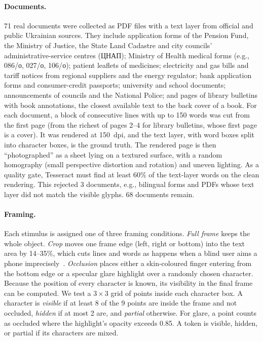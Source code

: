 \documentclass[pdflatex,sn-mathphys-num]{sn-jnl}%
\theoremstyle{thmstyleone}%
\theoremstyle{thmstyletwo}%
\theoremstyle{thmstylethree}%
\newcommand{\NDoc}{68}
\newcommand{\NDocsCollected}{71}
\newcommand{\NDocsRejected}{3}
\begin{document}
\paragraph{Documents.} \NDocsCollected{} real documents were collected as PDF files with a text layer from official and public Ukrainian sources. They include application forms of the Pension Fund, the Ministry of Justice, the State Land Cadastre and city councils' administrative-service centres (\foreignlanguage{ukrainian}{ЦНАП}); Ministry of Health medical forms (e.g., 086/\foreignlanguage{ukrainian}{о}, 027/\foreignlanguage{ukrainian}{о}, 106/\foreignlanguage{ukrainian}{о}); patient leaflets of medicines; electricity and gas bills and tariff notices from regional suppliers and the energy regulator; bank application forms and consumer-credit passports; university and school documents; announcements of councils and the National Police; and pages of library bulletins with book annotations, the closest available text to the back cover of a book. For each document, a block of consecutive lines with up to 150 words was cut from the first page (from the richest of pages 2--4 for library bulletins, whose first page is a cover). It was rendered at 150~dpi, and the text layer, with word boxes split into character boxes, is the ground truth. The rendered page is then ``photographed'' as a sheet lying on a textured surface, with a random homography (small perspective distortion and rotation) and uneven lighting. As a quality gate, Tesseract must find at least 60\% of the text-layer words on the clean rendering. This rejected \NDocsRejected{} documents, e.g., bilingual forms and PDFs whose text layer did not match the visible glyphs. \NDoc{} documents remain.

\paragraph{Framing.} Each stimulus is assigned one of three framing conditions. \emph{Full frame} keeps the whole object. \emph{Crop} moves one frame edge (left, right or bottom) into the text area by 14--35\%, which cuts lines and words as happens when a blind user aims a phone imprecisely~\cite{gurari2018vizwiz}. \emph{Occlusion} places either a skin-coloured finger entering from the bottom edge or a specular glare highlight over a randomly chosen character. Because the position of every character is known, its visibility in the final frame can be computed. We test a $3\times3$ grid of points inside each character box. A character is \emph{visible} if at least 8 of the 9 points are inside the frame and not occluded, \emph{hidden} if at most 2 are, and \emph{partial} otherwise. For glare, a point counts as occluded where the highlight's opacity exceeds 0.85. A token is visible, hidden, or partial if its characters are mixed. 
\end{document}
